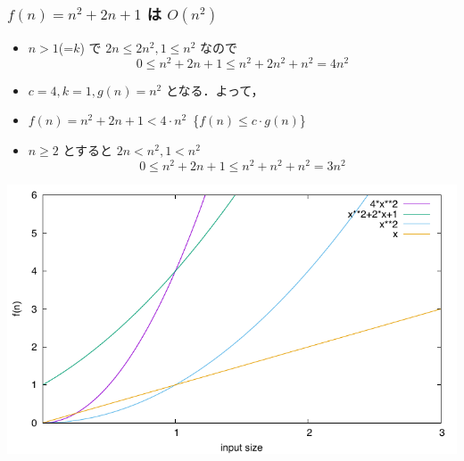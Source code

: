 \begin{frame}[shrink]
\frametitle{\(f(n)=n^2+2n+1\) は \(O(n^2)\)}
  \begin{itemize}
\item \(n>1\)(=\(k\)) で \(2n\leq 2n^2, 1\leq n^2\) なので
    \begin{displaymath}
0\leq n^2+2n+1\leq n^2+2n^2+n^2= 4n^2
    \end{displaymath}
\item \(c=4, k=1, g(n)=n^2\) となる．よって，
\item \(f(n)=n^2+2n+1<4\cdot n^2\)\ \textemdash\{\(f(n)\leq c\cdot g(n)\)\}
\item \(n\geq 2\) とすると \(2n<n^2, 1<n^2\) 
    \begin{displaymath}
0\leq n^2+2n+1\leq n^2+n^2+n^2= 3n^2
    \end{displaymath}
  \end{itemize}
  \begin{center}
\includegraphics[scale=0.6]{./progs/witness.pdf}
  \end{center}
\end{frame}
